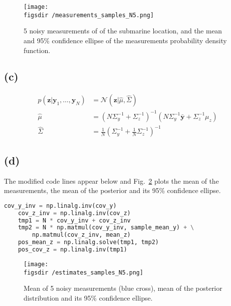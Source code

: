 \documentclass[12pt]{article}
\def\figsdir{../../../../../../code/scripts/probability/multivariateGaussians/inferenceInTheLinearGaussianModel/figures/}
\begin{document}
\begin{center}
    \begin{figure}[H]
        \texttt{[image: \\figsdir /measurements\_samples\_N5.png]}
        \caption{5 noisy measurements of of the submarine location, and the mean
        and 95\% confidence ellipse of the measurements probability density
        function.}
        \label{fig:b}
    \end{figure}
\end{center}

\subsection*{(c)} 

\begin{align*}
    p(\mathbf{z}|\mathbf{y}_1,\ldots,\mathbf{y}_N)&=\mathcal{N}(\mathbf{z}|\hat{\mu},\hat{\Sigma})\\
    \hat{\mu}&=\left(N\Sigma_y^{-1}+\Sigma_z^{-1}\right)^{-1}\left(N\Sigma_y^{-1}\bar{\mathbf{y}}+\Sigma_z^{-1}\mu_z\right)\\
    \hat{\Sigma}&=\frac{1}{N}\left(\Sigma_y^{-1}+\frac{1}{N}\Sigma_z^{-1}\right)^{-1}
\end{align*}

\subsection*{(d)} The modified code lines appear below and Fig.~\ref{fig:d}
plots the mean of the measurements, the mean of the posterior and its 95\%
confidence ellipse.

\begin{lstlisting}[language=Python]
    cov_y_inv = np.linalg.inv(cov_y)
    cov_z_inv = np.linalg.inv(cov_z)
    tmp1 = N * cov_y_inv + cov_z_inv
    tmp2 = N * np.matmul(cov_y_inv, sample_mean_y) + \
        np.matmul(cov_z_inv, mean_z)
    pos_mean_z = np.linalg.solve(tmp1, tmp2)
    pos_cov_z = np.linalg.inv(tmp1)
\end{lstlisting}

\begin{center}
    \begin{figure}[H]
        \texttt{[image: \\figsdir /estimates\_samples\_N5.png]}
        \caption{Mean of 5 noisy measurements (blue cross), mean of the posterior
        distribution and its 95\% confidence ellipse.}
        \label{fig:d}
    \end{figure}
\end{center}
\end{document}
